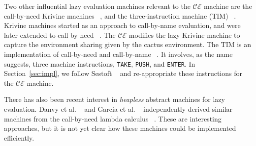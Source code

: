 Two other influential lazy evaluation machines relevant to the $\mathcal{CE}$
machine are the call-by-need Krivine machines
~\cite{lkm,krivine2007call,sestoft}, and the three-instruction machine (TIM)
~\cite{TIM}.  Krivine machines started as an approach to call-by-name
evaluation, and were later extended to call-by-need
~\cite{krivine2007call,sestoft,danvy2013synthetic,lkm}.  The $\mathcal{CE}$
modifies the lazy Krivine machine to capture the environment sharing given by
the cactus environment. The TIM is an implementation of call-by-need and
call-by-name ~\cite{TIM}.  It involves, as the name suggests, three machine
instructions, \texttt{TAKE}, \texttt{PUSH}, and \texttt{ENTER}. In
Section~\ref{sec:impl}, we follow Sestoft ~\cite{sestoft} and
re-appropriate these instructions for the $\mathcal{CE}$ machine.

There has also been recent interest in \emph{heapless} abstract
machines for lazy evaluation. Danvy et al. ~\cite{danvy2012inter} and
Garcia et al. ~\cite{garcia2009lazy} independently derived similar
machines from the call-by-need lambda calculus
~\cite{ariola1995call}. These are interesting approaches, but it is not yet
clear how these machines could be implemented efficiently.
